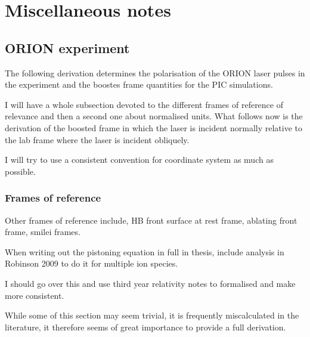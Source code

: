 \chapter{\label{ch:x-misc}Miscellaneous notes}

\minitoc

\section{ORION experiment} 
The following derivation determines the polarisation of the ORION laser pulses in the experiment and the boostes frame quantities for the PIC simulations.

I will have a whole subsection devoted to the different frames of reference of relevance and then a second one about normalised units. What follows now is the derivation of the boosted frame in which the laser is incident normally relative to the lab frame where the laser is incident obliquely.

I will try to use a consistent convention for coordinate system as much as possible.

\subsection{Frames of reference}
Other frames of reference include, HB front surface at rest frame, ablating front frame, smilei frames. 

When writing out the pistoning equation in full in thesis, include analysis in Robinson 2009 to do it for multiple ion species.



I should go over this and use third year relativity notes to formalised and make more consistent.

While some of this section may seem trivial, it is frequently miscalculated in the literature, it therefore seems of great importance to provide a full derivation.

